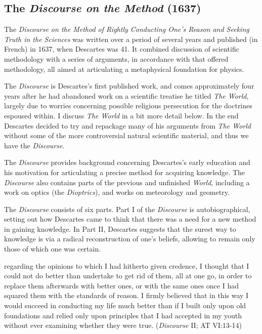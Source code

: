 \documentclass[12pt]{article}
\begin{document}
\subsection{The \emph{Discourse on the Method} (1637)}
\label{sec:orgdef538d}
The \emph{Discourse on the Method of Rightly Conducting One's Reason and Seeking Truth in
the Sciences} was written over a period of several years and published (in French) in
1637, when Descartes was 41. It combined discussion of scientific methodology with a
series of arguments, in accordance with that offered methodology, all aimed at
articulating a metaphysical foundation for physics.

The \emph{Discourse} is Descartes's first published work, and comes approximately four years
after he had abandoned work on a scientific treatise he titled \emph{The World}, largely due
to worries concerning possible religious persecution for the doctrines espoused
within. I discuss \emph{The World} in a bit more detail below. In the end Descartes decided
to try and repackage many of his arguments from \emph{The World} without some of the more
controversial natural scientific material, and thus we have the \emph{Discourse}.

The \emph{Discourse} provides background concerning Descartes's early education and his
motivation for articulating a precise method for acquiring knowledge. The \emph{Discourse}
also contains parts of the previous and unfinished \emph{World}, including a work on optics
(the \emph{Dioptrics}), and works on meteorology and geometry.

The \emph{Discourse} consists of six parts. Part I of the \emph{Discourse} is autobiographical,
setting out how Descartes came to think that there was a need for a new method in
gaining knowledge. In Part II, Descartes suggests that the surest way to knowledge is
via a radical reconstruction of one's beliefs, allowing to remain only those of which
one was certain.

\begin{quote-b}
regarding the opinions to which I had hitherto given credence, I thought that I
could not do better than undertake to get rid of them, all at one go, in order to
replace them afterwards with better ones, or with the same ones once I had squared
them with the standards of reason. I firmly believed that in this way I would
succeed in conducting my life much better than if I built only upon old foundations
and relied only upon principles that I had accepted in my youth without ever
examining whether they were true. (\emph{Discourse} II; AT VI:13-14)
\end{quote-b}
\end{document}
